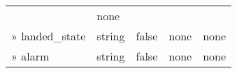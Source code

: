 \documentclass[
]{article}
\begin{document}
\begin{longtable}[]{@{}lllll@{}}
\begin{minipage}[t]{0.17\columnwidth}
\end{minipage} & \begin{minipage}[t]{0.17\columnwidth}\raggedright
none\strut
\end{minipage}\tabularnewline
\begin{minipage}[t]{0.17\columnwidth}\raggedright
» landed\_state\strut
\end{minipage} & \begin{minipage}[t]{0.17\columnwidth}\raggedright
string\strut
\end{minipage} & \begin{minipage}[t]{0.17\columnwidth}\raggedright
false\strut
\end{minipage} & \begin{minipage}[t]{0.17\columnwidth}\raggedright
none\strut
\end{minipage} & \begin{minipage}[t]{0.17\columnwidth}\raggedright
none\strut
\end{minipage}\tabularnewline
\begin{minipage}[t]{0.17\columnwidth}\raggedright
» alarm\strut
\end{minipage} & \begin{minipage}[t]{0.17\columnwidth}\raggedright
string\strut
\end{minipage} & \begin{minipage}[t]{0.17\columnwidth}\raggedright
false\strut
\end{minipage} & \begin{minipage}[t]{0.17\columnwidth}\raggedright
none\strut
\end{minipage} & \begin{minipage}[t]{0.17\columnwidth}\raggedright
none\strut
\end{minipage}\tabularnewline
\bottomrule
\end{longtable}
\end{document}
